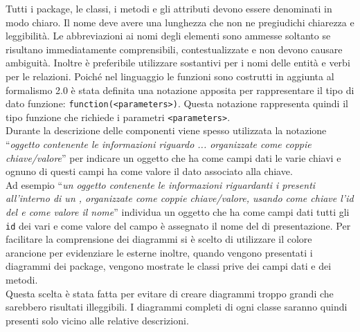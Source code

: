 \label{normeProgettuali}
\label{sdeer}
Tutti i package, le classi, i metodi e gli attributi devono essere denominati in modo chiaro. Il nome deve avere una lunghezza che non ne pregiudichi chiarezza e leggibilità. Le abbreviazioni ai nomi degli elementi sono ammesse soltanto se risultano immediatamente comprensibili, contestualizzate e non devono causare ambiguità. Inoltre è preferibile utilizzare sostantivi per i nomi delle entità e verbi per le relazioni.
Poiché nel linguaggio  le funzioni sono costrutti  in aggiunta al formalismo  2.0 è stata definita una notazione apposita per rappresentare il tipo di dato funzione: \texttt{function(<parameters>)}. Questa notazione rappresenta quindi il tipo funzione che richiede i parametri \texttt{<parameters>}.\\
Durante la descrizione delle componenti viene spesso utilizzata la notazione ``\textit{oggetto contenente le informazioni riguardo ... organizzate come coppie chiave/valore}'' per indicare un oggetto  che ha come campi dati le varie chiavi e ognuno di questi campi ha come valore il dato associato alla chiave. \\
Ad esempio ``\textit{un oggetto contenente le informazioni riguardanti i  presenti all'interno di un , organizzate come coppie chiave/valore, usando come chiave l'id del  e come valore il nome}'' individua un oggetto che ha come campi dati tutti gli \texttt{id} dei vari  e come valore del campo è assegnato il nome del  di presentazione.
Per facilitare la comprensione dei diagrammi  si è scelto di utilizzare il colore arancione per evidenziare le  esterne inoltre, quando vengono presentati i diagrammi dei package, vengono mostrate le classi prive dei campi dati e dei metodi.\\
Questa scelta è stata fatta per evitare di creare diagrammi troppo grandi che sarebbero risultati illeggibili.
I diagrammi completi di ogni classe saranno quindi presenti solo vicino alle relative descrizioni.
\label{std_angular}
\label{notazioneControllersAngularJS}
